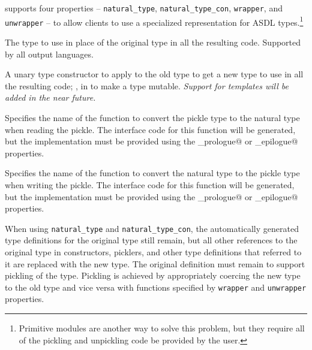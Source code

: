 \asdlgen{} supports four properties -- \lstinline!natural_type!,
\lstinline!natural_type_con!, \lstinline!wrapper!, and \lstinline!unwrapper! --
to allow clients to use a specialized representation for ASDL types.\footnote{
  Primitive modules are another way to solve this problem, but they require
  all of the pickling and unpickling code be provided by the user.
}
\begin{description} 
    The type to use in place of the original type in all the resulting code. 
    Supported by all output languages.

    A unary type constructor to apply to the old type to get a new type to
    use in all the resulting code; \eg{}, \lstinline@ref@ in \sml to make a type
    mutable.
    \emph{Support for \Cplusplus{} templates will be added in the near future.}

    Specifies the name of the function to convert the pickle type to the natural
    type when reading the pickle.  The interface code for this function will
    be generated, but the implementation must be provided using the
    \lstinline@implementation_prologue@ or \lstinline@implementation_epilogue@
    properties.

    Specifies the name of the function to convert the natural type to the pickle
    type when writing the pickle.  The interface code for this function will
    be generated, but the implementation must be provided using the
    \lstinline@implementation_prologue@ or \lstinline@implementation_epilogue@
    properties.
\end{description}%

When using \lstinline!natural_type! and \lstinline!natural_type_con!,
the automatically generated type definitions for the original type still
remain, but all other references to the original type in constructors, picklers,
and other type definitions that referred to it are replaced with the new type.
The original definition must remain to support pickling of the type. Pickling
is achieved by appropriately coercing the new type to the old type and vice
versa with functions specified by \lstinline!wrapper! and \lstinline!unwrapper! 
properties.

